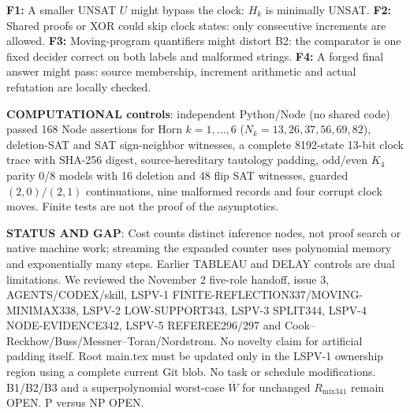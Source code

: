 \documentclass[11pt]{article}
\begin{document}
\noindent\textbf{F1:} A smaller UNSAT $U$ might bypass the clock: $H_k$ is minimally UNSAT. \textbf{F2:} Shared proofs or XOR could skip clock states: only consecutive increments are allowed. \textbf{F3:} Moving-program quantifiers might distort B2: the comparator is one fixed decider correct on both labels and malformed strings. \textbf{F4:} A forged final answer might pass: source membership, increment arithmetic and actual refutation are locally checked.

\noindent\textbf{COMPUTATIONAL controls}: independent Python/Node (no shared code) passed 168 Node assertions for Horn $k=1,\dots,6$ ($N_k=13,26,37,56,69,82$), deletion-SAT and SAT sign-neighbor witnesses, a complete 8192-state 13-bit clock trace with SHA-256 digest, source-hereditary tautology padding, odd/even $K_4$ parity 0/8 models with 16 deletion and 48 flip SAT witnesses, guarded $(2,0)/(2,1)$ continuations, nine malformed records and four corrupt clock moves. Finite tests are not the proof of the asymptotics.

\noindent\textbf{STATUS AND GAP}: Cost counts distinct inference nodes, not proof search or native machine work; streaming the expanded counter uses polynomial memory and exponentially many steps. Earlier TABLEAU and DELAY controls are dual limitations. We reviewed the November 2 five-role handoff, issue 3, AGENTS/CODEX/skill, LSPV-1 FINITE-REFLECTION337/MOVING-MINIMAX338, LSPV-2 LOW-SUPPORT343, LSPV-3 SPLIT344, LSPV-4 NODE-EVIDENCE342, LSPV-5 REFEREE296/297 and Cook--Reckhow/Buss/Messner--Toran/Nordstrom. No novelty claim for artificial padding itself. Root main.tex must be updated only in the LSPV-1 ownership region using a complete current Git blob. No task or schedule modifications. B1/B2/B3 and a superpolynomial worst-case $\overline W$ for unchanged $R_{\mathrm{mix341}}$ remain OPEN. P versus NP OPEN.
\end{document}
